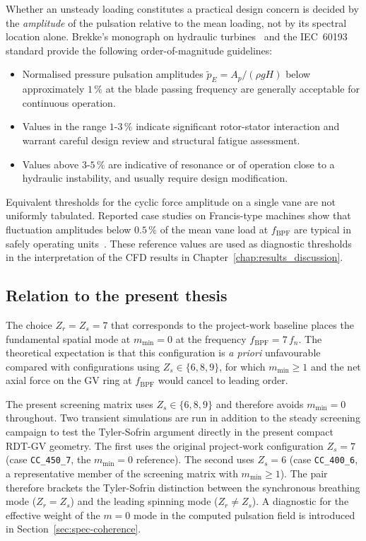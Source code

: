 Whether an unsteady loading constitutes a practical design concern is decided by the \emph{amplitude} of the pulsation relative to the mean loading, not by its spectral location alone. Brekke's monograph on hydraulic turbines~\cite{Brekke2015,Brekke2010} and the IEC~60193 standard provide the following order-of-magnitude guidelines:
\begin{itemize}
  \item Normalised pressure pulsation amplitudes $\tilde{p}_{E} = A_p / (\rho g H)$ below approximately $1\,\%$ at the blade passing frequency are generally acceptable for continuous operation.
  \item Values in the range $1$-$3\,\%$ indicate significant rotor-stator interaction and warrant careful design review and structural fatigue assessment.
  \item Values above $3$-$5\,\%$ are indicative of resonance or of operation close to a hydraulic instability, and usually require design modification.
\end{itemize}
Equivalent thresholds for the cyclic force amplitude on a single vane are not uniformly tabulated. Reported case studies on Francis-type machines show that fluctuation amplitudes below $0.5\,\%$ of the mean vane load at $f_{\mathrm{BPF}}$ are typical in safely operating units~\cite{Egusquiza2006}. These reference values are used as diagnostic thresholds in the interpretation of the CFD results in Chapter~\ref{chap:results_discussion}.
 
\subsection{Relation to the present thesis}
\label{sec:rsi-thesis}
 
The choice $Z_r = Z_s = 7$ that corresponds to the project-work baseline places the fundamental spatial mode at $m_{\min} = 0$ at the frequency $f_{\mathrm{BPF}} = 7\,f_n$. The theoretical expectation is that this configuration is \emph{a priori} unfavourable compared with configurations using $Z_s \in \{6,8,9\}$, for which $m_{\min} \geq 1$ and the net axial force on the GV ring at $f_{\mathrm{BPF}}$ would cancel to leading order.
 
The present screening matrix uses $Z_s \in \{6,8,9\}$ and therefore avoids $m_{\min}=0$ throughout. Two transient simulations are run in addition to the steady screening campaign to test the Tyler-Sofrin argument directly in the present compact RDT-GV geometry. The first uses the original project-work configuration $Z_s = 7$ (case \texttt{CC\_450\_7}, the $m_{\min}=0$ reference). The second uses $Z_s = 6$ (case \texttt{CC\_400\_6}, a representative member of the screening matrix with $m_{\min} \geq 1$). The pair therefore brackets the Tyler-Sofrin distinction between the synchronous breathing mode ($Z_r=Z_s$) and the leading spinning mode ($Z_r\neq Z_s$). A diagnostic for the effective weight of the $m=0$ mode in the computed pulsation field is introduced in Section~\ref{sec:spec-coherence}.

